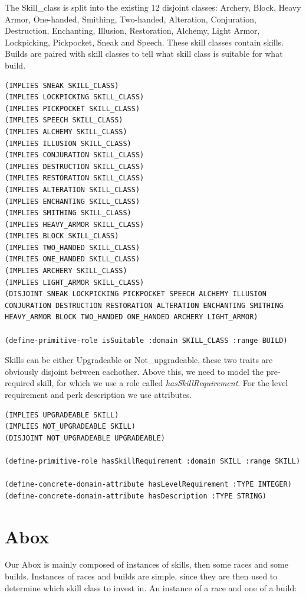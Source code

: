 \documentclass[a4paper,12pt]{report}
\begin{document}
The Skill\_class is split into the existing 12 disjoint classes: Archery, Block, Heavy Armor, One-handed, Smithing, Two-handed, Alteration, Conjuration, Destruction, Enchanting, Illusion, Restoration, Alchemy, Light Armor, Lockpicking, Pickpocket, Sneak and Speech. These skill classes contain skills. Builds are paired with skill classes to tell what skill class is suitable for what build.

\begin{lstlisting}
(IMPLIES SNEAK SKILL_CLASS)
(IMPLIES LOCKPICKING SKILL_CLASS)
(IMPLIES PICKPOCKET SKILL_CLASS)
(IMPLIES SPEECH SKILL_CLASS)
(IMPLIES ALCHEMY SKILL_CLASS)
(IMPLIES ILLUSION SKILL_CLASS)
(IMPLIES CONJURATION SKILL_CLASS)
(IMPLIES DESTRUCTION SKILL_CLASS)
(IMPLIES RESTORATION SKILL_CLASS)
(IMPLIES ALTERATION SKILL_CLASS)
(IMPLIES ENCHANTING SKILL_CLASS)
(IMPLIES SMITHING SKILL_CLASS)
(IMPLIES HEAVY_ARMOR SKILL_CLASS)
(IMPLIES BLOCK SKILL_CLASS)
(IMPLIES TWO_HANDED SKILL_CLASS)
(IMPLIES ONE_HANDED SKILL_CLASS)
(IMPLIES ARCHERY SKILL_CLASS)
(IMPLIES LIGHT_ARMOR SKILL_CLASS)
(DISJOINT SNEAK LOCKPICKING PICKPOCKET SPEECH ALCHEMY ILLUSION CONJURATION DESTRUCTION RESTORATION ALTERATION ENCHANTING SMITHING HEAVY_ARMOR BLOCK TWO_HANDED ONE_HANDED ARCHERY LIGHT_ARMOR)

(define-primitive-role isSuitable :domain SKILL_CLASS :range BUILD)
\end{lstlisting}

Skills can be either Upgradeable or Not\_upgradeable, these two traits are obviously disjoint between eachother. Above this, we need to model the pre-required skill, for which we use a role called \textit{hasSkillRequirement}. For the level requirement and perk description we use attributes.

\begin{lstlisting}
(IMPLIES UPGRADEABLE SKILL)
(IMPLIES NOT_UPGRADEABLE SKILL)
(DISJOINT NOT_UPGRADEABLE UPGRADEABLE)

(define-primitive-role hasSkillRequirement :domain SKILL :range SKILL)

(define-concrete-domain-attribute hasLevelRequirement :TYPE INTEGER)
(define-concrete-domain-attribute hasDescription :TYPE STRING)
\end{lstlisting}

\section{Abox}
Our Abox is mainly composed of instances of skills, then some races and some builds.
Instances of races and builds are simple, since they are then used to determine which skill class to invest in.
An instance of a race and one of a build:
\end{document}
